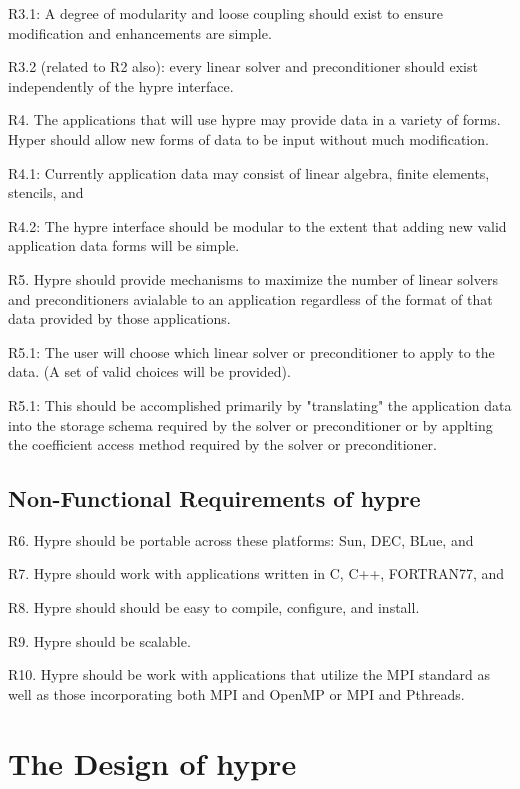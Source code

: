 	R3.1: A degree of modularity and loose coupling should exist to 
	ensure modification and enhancements are simple.

	R3.2 (related to R2 also): every linear solver and preconditioner
	should exist independently of the hypre interface.

	
R4.	The applications that will use hypre may provide data in a variety
	of forms.  Hyper should allow new forms of data to be input
	without much modification.
	
	R4.1: Currently application data may consist of linear algebra, 
	finite elements, stencils, and

	R4.2: The hypre interface should be modular to the extent that adding
	new valid application data forms will be simple.


R5.	Hypre should provide mechanisms to maximize the number of linear
	solvers and preconditioners avialable to an application regardless of 
	the format of that data provided by those applications.  

	R5.1: The user will choose which linear solver or preconditioner
	to apply to the data. (A set of valid choices will be provided).
	
	R5.1: This should be accomplished primarily by "translating" the 
	application data into the storage schema required by the solver or
	preconditioner or by applting the coefficient access method 
	required by the solver or preconditioner.

\subsection{Non-Functional Requirements of hypre}

R6.	Hypre should be portable across these platforms: Sun, DEC, BLue, and
	
R7.	Hypre should work with applications written in C, C++, FORTRAN77, and
	
R8.	Hypre should should be easy to compile, configure, and install.

R9.	Hypre should be scalable.

R10.	Hypre should be work with applications that utilize the MPI standard
	as well as those incorporating both MPI and OpenMP or MPI and Pthreads.

\section{The Design of hypre}

